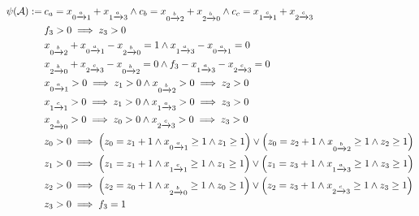 \documentclass[acmsmall,review,anonymous,screen]{acmart}\settopmatter{printfolios=true,printccs=false,printacmref=true}
\theoremstyle{definition}
\begin{document}
\begin{equation}
  \begin{aligned}
  \operatorname{\psi}(\mathcal{A}):=\:
  &c_{a} = x_{0 \xrightarrow{a} 1} + x_{1 \xrightarrow{a} 3} \land c_{b} = x_{0 \xrightarrow{b} 2} + x_{2 \xrightarrow{b} 0} \land c_{c} = x_{1 \xrightarrow{c} 1} + x_{2 \xrightarrow{c} 3}\\
  &f_{3} > 0 \implies z_{3} > 0\\
  &x_{0 \xrightarrow{b} 2} + x_{0 \xrightarrow{a} 1} - x_{2 \xrightarrow{b} 0} = 1 \land  x_{1 \xrightarrow{a} 3} - x_{0 \xrightarrow{a} 1} = 0\\
  & x_{2 \xrightarrow{b} 0} + x_{2 \xrightarrow{c} 3} - x_{0 \xrightarrow{b} 2} = 0 \land f_{3}  - x_{1 \xrightarrow{a} 3} - x_{2 \xrightarrow{c} 3} = 0\\
  &x_{0 \xrightarrow{a} 1} > 0 \implies z_{1} > 0 \land x_{0 \xrightarrow{b} 2} > 0 \implies z_{2} > 0\\
  &x_{1 \xrightarrow{c} 1} > 0 \implies z_{1} > 0 \land x_{1 \xrightarrow{a} 3} > 0 \implies z_{3} > 0\\
  &x_{2 \xrightarrow{b} 0} > 0 \implies z_{0} > 0 \land x_{2 \xrightarrow{c} 3} > 0 \implies z_{3} > 0\\
  &z_{0} > 0 \implies \left(z_{0} = z_{1} + 1 \land x_{0 \xrightarrow{a} 1} \geq 1 \land z_{1} \geq 1\right) \lor \left(z_{0} = z_{2} + 1 \land x_{0 \xrightarrow{b} 2} \geq 1 \land z_{2} \geq 1\right)\\
  &z_{1} > 0 \implies \left(z_{1} = z_{1} + 1 \land x_{1 \xrightarrow{c} 1} \geq 1 \land z_{1} \geq 1\right) \lor \left(z_{1} = z_{3} + 1 \land x_{1 \xrightarrow{a} 3} \geq 1 \land z_{3} \geq 1\right)\\
  &z_{2} > 0 \implies \left(z_{2} = z_{0} + 1 \land x_{2 \xrightarrow{b} 0} \geq 1 \land z_{0} \geq 1\right) \lor \left(z_{2} = z_{3} + 1 \land x_{2 \xrightarrow{c} 3} \geq 1 \land z_{3} \geq 1\right)\\
  &z_{3} > 0 \implies f_{3} = 1
  \end{aligned}
  \label{eq:parikh-formula}
  \end{equation}
    
\end{document}
